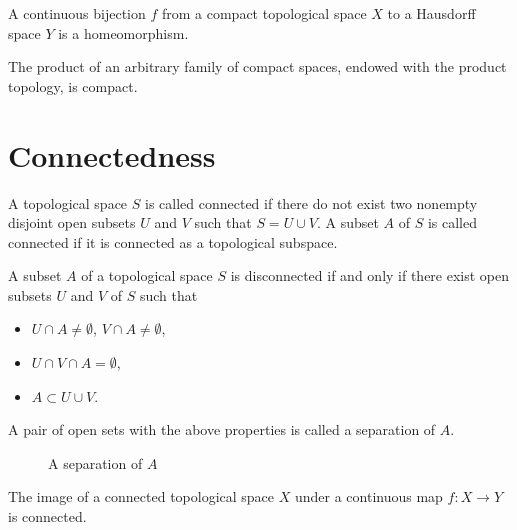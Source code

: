 \begin{corollary}\label{cor:from-compact-to-hausdorff}
	A continuous bijection $f$ from a compact topological space $X$ to a
	Hausdorff space $Y$ is a homeomorphism.
\end{corollary}



\begin{theorem}[Tychonoff] The product of an arbitrary family of compact
	spaces, endowed with the product topology, is compact.
\end{theorem}




\section{Connectedness}
\begin{definition}
	A topological space $S$ is called connected if there do not exist two
	nonempty disjoint open subsets $U$ and $V$ such that $S = U\cup V$. A
	subset $A$ of $S$ is called connected if it is connected as a
	topological subspace.
\end{definition}

\begin{proposition}
	A subset $A$ of a topological space $S$ is disconnected if and only if
	there exist open subsets $U$ and $V$ of $S$ such that
	\begin{itemize}
		\item $U\cap A\neq \emptyset$, $V\cap A \neq \emptyset$,
		\item $U\cap V \cap A = \emptyset$,
		\item $A\subset U\cup V$.
	\end{itemize}
	A pair of open sets with the above properties is called a separation of
	$A$.
\end{proposition}

\begin{figure}[htbp]
	\centering
	\caption{A separation of $A$}
\end{figure}

\begin{proposition}
	The image of a connected topological space $X$ under a continuous map
	$f:X\to Y$ is connected.
\end{proposition}

